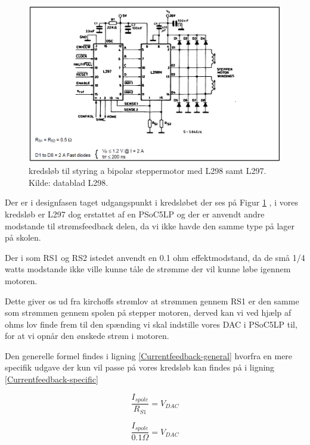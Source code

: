 \begin{figure}[H]
	\centering
	\includegraphics[scale=0.5]{billeder/kredsloebL297L298}
	\caption{kredsløb til styring a bipolar steppermotor med L298 samt L297. Kilde: datablad L298.}
	\label{L298L297}
\end{figure}

Der er i designfasen taget udgangspunkt i kredsløbet der ses på Figur \ref{L298L297} , i vores kredsløb er L297 dog erstattet af en PSoC5LP og der er anvendt andre modstande til strømsfeedback delen, da vi ikke havde den samme type på lager på skolen.

Der i som RS1 og RS2 istedet anvendt en 0.1 ohm effektmodstand, da de små 1/4 watts modstande ikke ville kunne tåle de strømme der vil kunne løbe igennem motoren.

Dette giver os ud fra kirchoffs strømlov at strømmen gennem RS1 er den samme som strømmen gennem spolen på stepper motoren, derved kan vi ved hjælp af ohms lov finde frem til den spænding vi skal indstille vores DAC i PSoC5LP til, for at vi opnår den ønskede strøm i motoren.

Den generelle formel findes i ligning \ref{Currentfeedback-general} hvorfra en mere specifik udgave der kun vil passe på vores kredsløb kan findes på i ligning \ref{Currentfeedback-specific}

\begin{equation}
\label{Currentfeedback-general}
	\frac{I_{spole}}{R_{S1}}=V_{DAC}
\end{equation}

\begin{equation}
\label{Currentfeedback-specific}
\frac{I_{spole}}{0.1\Omega}=V_{DAC}
\end{equation}


	
